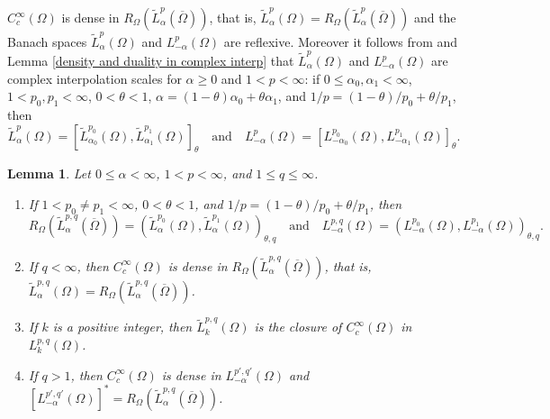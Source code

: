 \documentclass[reqno,centertags,11pt]{amsart}
\newtheorem{lem}[thm]{Lemma}
\theoremstyle{definition}
\numberwithin{thm}{section}
\numberwithin{equation}{section}
\newcommand{\R}{{\mathbb{R}}}
\begin{document}
$C_c^\infty (\Omega  )$ is dense in $R_\Omega  (\widetilde{L}_\alpha^{p} (\overline{\Omega} )  )$, that is, $\widetilde{L}_\alpha^{p}(\Omega ) = R_\Omega  (\widetilde{L}_\alpha^{p} (\overline{\Omega} )  ) $  and the Banach  spaces  $\widetilde{L}_\alpha^{p}(\Omega )$  and    $L_{-\alpha}^{p}(\Omega )$ are reflexive. Moreover it follows from   \cite[Proposition  2.11]{JK}  and Lemma \ref{density and duality in complex interp} that $\widetilde{L}_\alpha^{p}(\Omega )$  and    $L_{-\alpha}^{p}(\Omega )$ are complex interpolation scales for $\alpha \ge 0$ and $1<p<\infty$: if $0 \le     \alpha_0 , \alpha_1 < \infty$,  $1<    p_0 , p_1 < \infty$, $0<\theta < 1$, $\alpha =(1-\theta )\alpha_0 +\theta\alpha_1$, and $1/p =(1-\theta )/p_0 +\theta/p_1$, then
\begin{equation}\label{comp-interp-S on domains}
\widetilde{L}_{\alpha}^{p} (\Omega )  = \left[\widetilde{L}_{\alpha_0}^{p_0} (\Omega ) ,\widetilde{L}_{\alpha_1}^{p_1} (\Omega ) \right]_{\theta} \quad\mbox{and}\quad L_{-\alpha}^{p} (\Omega )  =   \left[ L_{-\alpha_0}^{p_0} (\Omega ) ,L_{-\alpha_1}^{p_1} (\Omega ) \right]_{\theta}.
\end{equation}


\begin{lem}\label{real-interp-S on domains} Let $0 \le   \alpha  <\infty$, $1< p  < \infty$,  and $ 1\le q  \le \infty$.
\begin{enumerate}[{\upshape (i)}]
\item  If      $1< p_0 \neq p_1 < \infty$, $0<\theta < 1$, and $1/p=(1-\theta)/p_0 +\theta/p_1$,    then
    \[
 R_\Omega  (\widetilde{L}_\alpha^{p,q} (\overline{\Omega} ) )  = \left( \widetilde{L}_\alpha^{p_0}(\Omega ) ,\widetilde{L}_\alpha^{p_1}(\Omega ) \right)_{\theta,q}
\quad\mbox{and}\quad
     L_{-\alpha}^{p,q} (\Omega )   = \left( L_{-\alpha}^{p_0} (\Omega ) ,L_{-\alpha}^{p_1} (\Omega ) \right)_{\theta,q}.
\]
\item If   $q<\infty$, then  $C_c^\infty (\Omega) $ is dense in $R_\Omega  (\widetilde{L}_\alpha^{p,q} (\overline{\Omega} ) )$, that is,   $\widetilde{L}_\alpha^{p,q}(\Omega )= R_\Omega  (\widetilde{L}_\alpha^{p,q} (\overline{\Omega} ) )$.
\item If  $k$ is  a positive integer, then $\widetilde{L}_k^{p,q}(\Omega ) $ is the closure of $C_c^\infty (\Omega) $ in $L_k^{p,q}(\Omega )$.
\item If $q>1$, then $C_c^\infty (\Omega )$ is dense in $L_{-\alpha}^{p',q'} (\Omega ) $ and $ \left[ L_{-\alpha}^{p', q'}(\Omega ) \right]^* = R_\Omega  (\widetilde{L}_\alpha^{p,q} (\overline{\Omega} ) )$.
\end{enumerate}
\end{lem}
\end{document}
